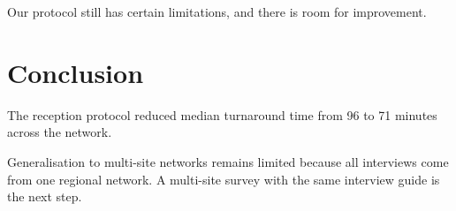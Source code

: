 \documentclass{article}
\begin{document}
Our protocol still has certain limitations, and there is room for improvement.

\section{Conclusion}
The reception protocol reduced median turnaround time from 96 to 71 minutes across the network.

Generalisation to multi-site networks remains limited because all interviews come from one regional network.
A multi-site survey with the same interview guide is the next step.
\end{document}
